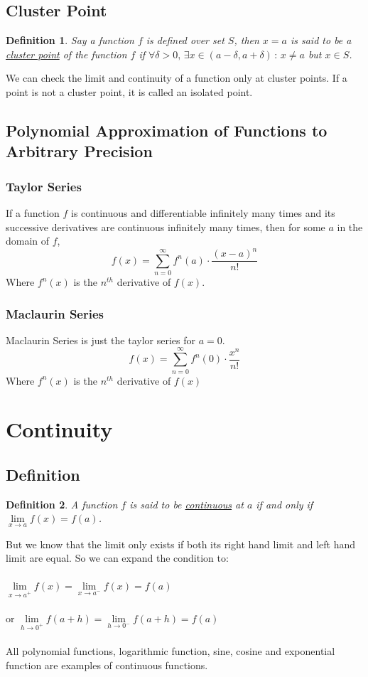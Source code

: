\documentclass[14]{article}
\newtheorem{define}{Definition}
\theoremstyle{definition}
\begin{document}
\subsection{Cluster Point}
\begin{define}
Say a function $f$ is defined over set $S$, then $x = a$ is said to be a \underline{cluster point} of the function $f$ if $\forall \delta > 0,\, \exists x \in (a - \delta, a + \delta)\, : \, x \neq a$ but $x \in S$.
\end{define}
We can check the limit and continuity of a function only at cluster points. If a point is not a cluster point, it is called an isolated point.
\subsection{Polynomial Approximation of Functions to Arbitrary Precision}
\subsubsection{Taylor Series}
If a function $f$ is continuous and differentiable infinitely many times and its successive derivatives are continuous infinitely many times, then for some $a$ in the domain of $f$,\\
\[f(x) = \sum\limits_{n=0}^{\infty} f^n(a) \cdot \dfrac{{(x-a)^n}}{n!}\]
Where $f^n(x)$ is the $n^{th}$ derivative of $f(x)$.
\subsubsection{Maclaurin Series}
Maclaurin Series is just the taylor series for $a = 0$.\\
\[f(x) = \sum\limits_{n=0}^{\infty} f^n(0) \cdot \dfrac{x^n}{n!}\]
Where $f^n(x)$ is the $n^{th}$ derivative of $f(x)$
\pagebreak
\section{Continuity}
\subsection{Definition}
\begin{define}
A function $f$ is said to be \underline{continuous} at $a$ if and only if $\lim\limits_{x \to a} f(x) = f(a)$.
\end{define}
But we know that the limit only exists if both its right hand limit and left hand limit are equal.
So we can expand the condition to:\\\\
$\lim\limits_{x \to a^+} f(x) = \lim\limits_{x \to a^-} f(x) = f(a)$\\\\
or $\lim\limits_{h \to 0^+} f(a+h) = \lim\limits_{h \to 0^-} f(a+h) = f(a)$\\\\
All polynomial functions, logarithmic function, sine, cosine and exponential function are examples of continuous functions.
\end{document}

